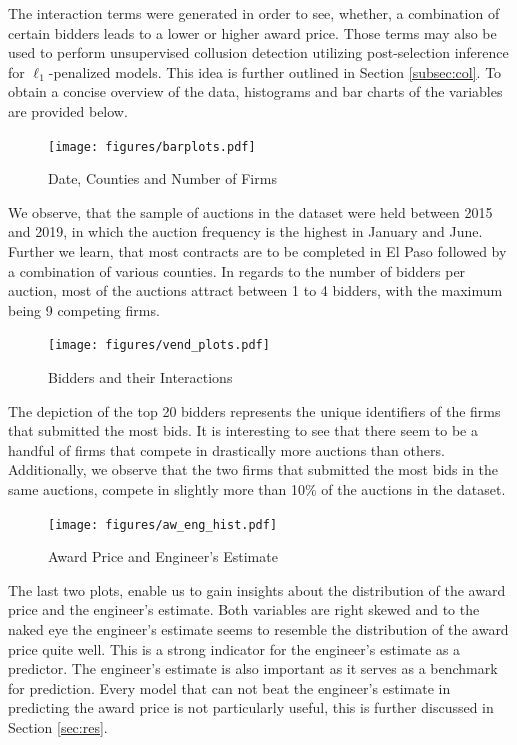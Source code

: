\documentclass[a4paper,12pt, headsepline]{scrartcl}
\numberwithin{equation}{section}
\begin{document}
The interaction terms were generated in order to see, whether, a combination of certain bidders leads to a lower or higher award price. Those terms may also be used to perform unsupervised collusion detection utilizing post-selection inference for $\ell_1$-penalized models. This idea is further outlined in Section \ref{subsec:col}. To obtain a concise overview of the data,  histograms and bar charts of the variables are provided below.

\begin{figure}[H]
	\texttt{[image: figures/barplots.pdf]}
	\caption{Date, Counties and Number of Firms}\label{fig:barplots}
\end{figure}

We observe, that the sample of auctions in the dataset were held between 2015 and 2019, in which the auction frequency is the highest in January and June. Further we learn, that most contracts are to be completed in El Paso followed by a combination of various counties. In regards to the number of bidders per auction, most of the auctions attract between 1 to 4 bidders, with the maximum being 9 competing firms.

\begin{figure}[H]
	\texttt{[image: figures/vend\_plots.pdf]}
	\caption{Bidders and their Interactions}\label{fig:vendplots}
\end{figure}

The depiction of the top 20 bidders represents the unique identifiers of the firms that submitted the most bids. It is interesting to see that there seem to be a handful of firms that compete in drastically more auctions than others. Additionally, we observe that the two firms that submitted the most bids in the same auctions, compete in slightly more than 10\% of the auctions in the dataset.

\begin{figure}[H]
	\texttt{[image: figures/aw\_eng\_hist.pdf]}
	\caption{Award Price and Engineer's Estimate}\label{fig:aweng}
\end{figure}

The last two plots, enable us to gain insights about the distribution of the award price and the engineer's estimate. Both variables are right skewed and to the naked eye the engineer's estimate seems to resemble the distribution of the award price quite well. This is a strong indicator for the engineer's estimate as a predictor. The engineer's estimate is also important as it serves as a benchmark for prediction. Every model that can not beat the engineer's estimate in predicting the award price is not particularly useful, this is further discussed in Section \ref{sec:res}.\\
\newpage
\end{document}
